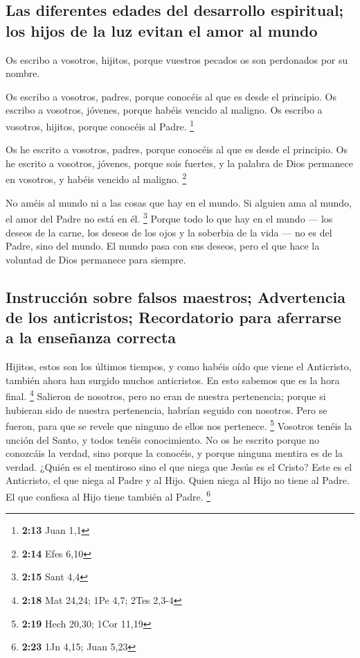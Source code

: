 \hypertarget{las-diferentes-edades-del-desarrollo-espiritual-los-hijos-de-la-luz-evitan-el-amor-al-mundo}{%
\subsection{Las diferentes edades del desarrollo espiritual; los hijos
de la luz evitan el amor al
mundo}\label{las-diferentes-edades-del-desarrollo-espiritual-los-hijos-de-la-luz-evitan-el-amor-al-mundo}}

 Os escribo a vosotros, hijitos, porque vuestros pecados
os son perdonados por su nombre.

 Os escribo a vosotros, padres, porque conocéis al que es
desde el principio. Os escribo a vosotros, jóvenes, porque habéis
vencido al maligno. Os escribo a vosotros, hijitos, porque conocéis al
Padre. \footnote{\textbf{2:13} Juan 1,1}

 Os he escrito a vosotros, padres, porque conocéis al que
es desde el principio. Os he escrito a vosotros, jóvenes, porque sois
fuertes, y la palabra de Dios permanece en vosotros, y habéis vencido al
maligno. \footnote{\textbf{2:14} Efes 6,10}

 No améis al mundo ni a las cosas que hay en el mundo. Si
alguien ama al mundo, el amor del Padre no está en él. \footnote{\textbf{2:15}
  Sant 4,4}  Porque todo lo que hay en el mundo --- los
deseos de la carne, los deseos de los ojos y la soberbia de la vida ---
no es del Padre, sino del mundo.  El mundo pasa con sus
deseos, pero el que hace la voluntad de Dios permanece para siempre.

\hypertarget{instrucciuxf3n-sobre-falsos-maestros-advertencia-de-los-anticristos-recordatorio-para-aferrarse-a-la-enseuxf1anza-correcta}{%
\subsection{Instrucción sobre falsos maestros; Advertencia de los
anticristos; Recordatorio para aferrarse a la enseñanza
correcta}\label{instrucciuxf3n-sobre-falsos-maestros-advertencia-de-los-anticristos-recordatorio-para-aferrarse-a-la-enseuxf1anza-correcta}}

 Hijitos, estos son los últimos tiempos, y como habéis
oído que viene el Anticristo, también ahora han surgido muchos
anticristos. En esto sabemos que es la hora final. \footnote{\textbf{2:18}
  Mat 24,24; 1Pe 4,7; 2Tes 2,3-4}  Salieron de nosotros,
pero no eran de nuestra pertenencia; porque si hubieran sido de nuestra
pertenencia, habrían seguido con nosotros. Pero se fueron, para que se
revele que ninguno de ellos nos pertenece. \footnote{\textbf{2:19} Hech
  20,30; 1Cor 11,19}  Vosotros tenéis la unción del
Santo, y todos tenéis conocimiento.  No os he escrito
porque no conozcáis la verdad, sino porque la conocéis, y porque ninguna
mentira es de la verdad.  ¿Quién es el mentiroso sino el
que niega que Jesús es el Cristo? Este es el Anticristo, el que niega al
Padre y al Hijo.  Quien niega al Hijo no tiene al Padre.
El que confiesa al Hijo tiene también al Padre. \footnote{\textbf{2:23}
  1Jn 4,15; Juan 5,23}

